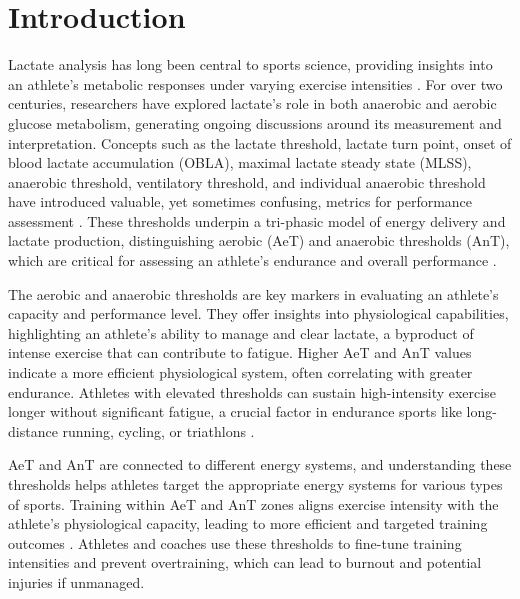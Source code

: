 \documentclass[a4paper,fleqn]{cas-dc}
\begin{document}
\maketitle

\section{Introduction}

Lactate analysis has long been central to sports science, providing insights into an athlete's metabolic responses under varying exercise intensities \cite{ref1, ref2}. For over two centuries, researchers have explored lactate's role in both anaerobic and aerobic glucose metabolism, generating ongoing discussions around its measurement and interpretation. Concepts such as the lactate threshold, lactate turn point, onset of blood lactate accumulation (OBLA), maximal lactate steady state (MLSS), anaerobic threshold, ventilatory threshold, and individual anaerobic threshold have introduced valuable, yet sometimes confusing, metrics for performance assessment \cite{ref3}. These thresholds underpin a tri-phasic model of energy delivery and lactate production, distinguishing aerobic (AeT) and anaerobic thresholds (AnT), which are critical for assessing an athlete's endurance and overall performance \cite{ref4}.

The aerobic and anaerobic thresholds are key markers in evaluating an athlete's capacity and performance level. They offer insights into physiological capabilities, highlighting an athlete’s ability to manage and clear lactate, a byproduct of intense exercise that can contribute to fatigue. Higher AeT and AnT values indicate a more efficient physiological system, often correlating with greater endurance. Athletes with elevated thresholds can sustain high-intensity exercise longer without significant fatigue, a crucial factor in endurance sports like long-distance running, cycling, or triathlons \cite{ref1, ref2, ref5, ref6, ref7}.

AeT and AnT are connected to different energy systems, and understanding these thresholds helps athletes target the appropriate energy systems for various types of sports. Training within AeT and AnT zones aligns exercise intensity with the athlete's physiological capacity, leading to more efficient and targeted training outcomes \cite{ref1}. Athletes and coaches use these thresholds to fine-tune training intensities and prevent overtraining, which can lead to burnout and potential injuries if unmanaged.
\end{document}
